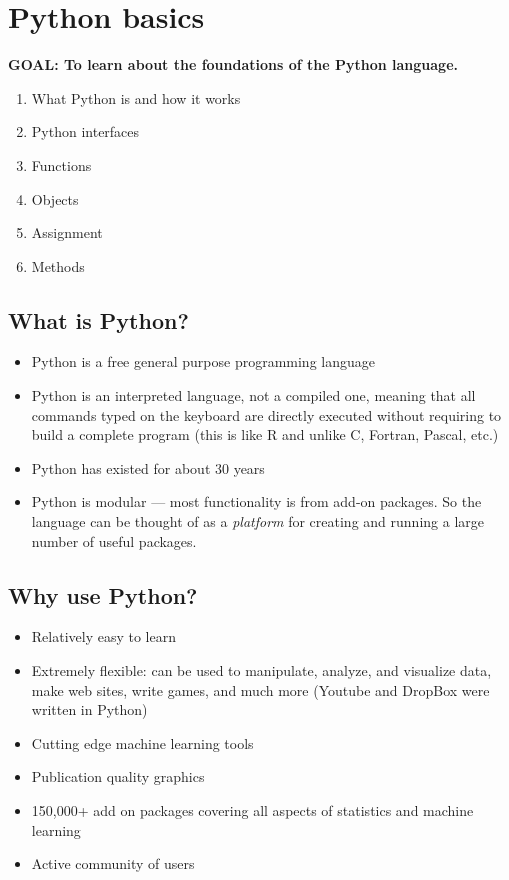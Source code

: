 \documentclass[]{book}
\providecommand{\tightlist}{%
  \setlength{\itemsep}{0pt}\setlength{\parskip}{0pt}}
\begin{document}
\section{Python basics}\label{python-basics}

\textbf{GOAL: To learn about the foundations of the Python language.}

\begin{enumerate}
\def\labelenumi{\arabic{enumi}.}
\tightlist
\item
  What Python is and how it works
\item
  Python interfaces
\item
  Functions
\item
  Objects
\item
  Assignment
\item
  Methods
\end{enumerate}

\subsection{What is Python?}\label{what-is-python}

\begin{itemize}
\tightlist
\item
  Python is a free general purpose programming language
\item
  Python is an interpreted language, not a compiled one, meaning that
  all commands typed on the keyboard are directly executed without
  requiring to build a complete program (this is like R and unlike C,
  Fortran, Pascal, etc.)
\item
  Python has existed for about 30 years
\item
  Python is modular --- most functionality is from add-on packages. So
  the language can be thought of as a \emph{platform} for creating and
  running a large number of useful packages.
\end{itemize}

\subsection{Why use Python?}\label{why-use-python}

\begin{itemize}
\tightlist
\item
  Relatively easy to learn
\item
  Extremely flexible: can be used to manipulate, analyze, and visualize
  data, make web sites, write games, and much more (Youtube and DropBox
  were written in Python)
\item
  Cutting edge machine learning tools
\item
  Publication quality graphics
\item
  150,000+ add on packages covering all aspects of statistics and
  machine learning
\item
  Active community of users
\end{itemize}
\end{document}
